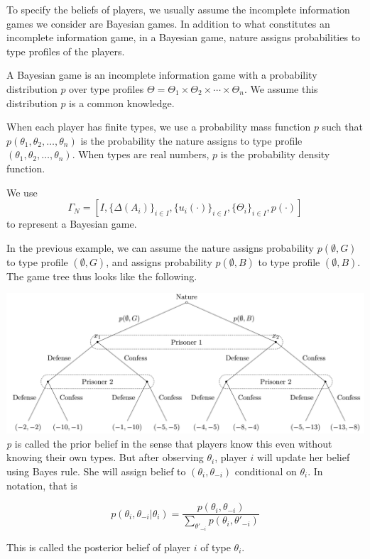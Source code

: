 \documentclass[12pt, oneside]{article}
\begin{document}
To specify the beliefs of players, we usually assume the incomplete information games we consider are Bayesian games. In addition to what constitutes an incomplete information game, in a Bayesian game, nature assigns probabilities to type profiles of the players.

A Bayesian game is an incomplete information game with a probability distribution \( p \) over type profiles \( \Theta = \Theta_1 \times \Theta_2 \times \cdots \times \Theta_n \). We assume this distribution \( p \) is a common knowledge.

When each player has finite types, we use a probability mass function \( p \) such that \( p(\theta_1, \theta_2, \dots, \theta_n) \) is the probability the nature assigns to type profile \( (\theta_1, \theta_2, \dots, \theta_n) \). When types are real numbers, \( p \) is the probability density function.

We use 
\[
\Gamma_N = [I, \{\Delta(A_i)\}_{i\in I}, \{u_i(\cdot)\}_{i\in I}, \{\Theta_i\}_{i\in I}, p(\cdot)]
\]
to represent a Bayesian game.

In the previous example, we can assume the nature assigns probability \( p(\emptyset, G) \) to type profile \( (\emptyset, G) \), and assigns probability \( p(\emptyset, B) \) to type profile \( (\emptyset, B) \). The game tree thus looks like the following.


\includegraphics{Figure/incom_tree_bey2.png}
\textit{p} is called the prior belief in the sense that players know this even without knowing their own types. But after observing \( \theta_i \), player \( i \) will update her belief using Bayes rule. She will assign belief to \( (\theta_i, \theta_{-i}) \) conditional on \( \theta_i \). In notation, that is

\[
p(\theta_i, \theta_{-i} | \theta_i) = \frac{p(\theta_i, \theta_{-i})}{\sum_{\theta'_{-i}} p(\theta_i, \theta'_{-i})}
\]

This is called the posterior belief of player \( i \) of type \( \theta_i \).
\end{document}
